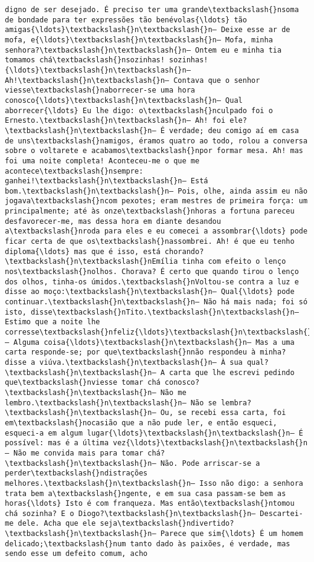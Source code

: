 \documentclass[11pt]{article}
\begin{document}
\begin{Verbatim}[commandchars=\\\{\}]
digno de ser desejado. É preciso ter uma grande\textbackslash{}nsoma de bondade para ter expressões tão benévolas{\ldots} tão amigas{\ldots}\textbackslash{}n\textbackslash{}n— Deixe esse ar de mofa, e{\ldots}\textbackslash{}n\textbackslash{}n— Mofa, minha senhora?\textbackslash{}n\textbackslash{}n— Ontem eu e minha tia tomamos chá\textbackslash{}nsozinhas! sozinhas!{\ldots}\textbackslash{}n\textbackslash{}n— Ah!\textbackslash{}n\textbackslash{}n— Contava que o senhor viesse\textbackslash{}naborrecer-se uma hora conosco{\ldots}\textbackslash{}n\textbackslash{}n— Qual aborrecer{\ldots} Eu lhe digo: o\textbackslash{}nculpado foi o Ernesto.\textbackslash{}n\textbackslash{}n— Ah! foi ele?\textbackslash{}n\textbackslash{}n— É verdade; deu comigo aí em casa de uns\textbackslash{}namigos, éramos quatro ao todo, rolou a conversa sobre o voltarete e acabamos\textbackslash{}npor formar mesa. Ah! mas foi uma noite completa! Aconteceu-me o que me acontece\textbackslash{}nsempre: ganhei!\textbackslash{}n\textbackslash{}n— Está bom.\textbackslash{}n\textbackslash{}n— Pois, olhe, ainda assim eu não jogava\textbackslash{}ncom pexotes; eram mestres de primeira força: um principalmente; até às onze\textbackslash{}nhoras a fortuna pareceu desfavorecer-me, mas dessa hora em diante desandou a\textbackslash{}nroda para eles e eu comecei a assombrar{\ldots} pode ficar certa de que os\textbackslash{}nassombrei. Ah! é que eu tenho diploma{\ldots} mas que é isso, está chorando?\textbackslash{}n\textbackslash{}nEmília tinha com efeito o lenço nos\textbackslash{}nolhos. Chorava? É certo que quando tirou o lenço dos olhos, tinha-os úmidos.\textbackslash{}nVoltou-se contra a luz e disse ao moço:\textbackslash{}n\textbackslash{}n— Qual{\ldots} pode continuar.\textbackslash{}n\textbackslash{}n— Não há mais nada; foi só isto, disse\textbackslash{}nTito.\textbackslash{}n\textbackslash{}n— Estimo que a noite lhe corresse\textbackslash{}nfeliz{\ldots}\textbackslash{}n\textbackslash{}n— Alguma coisa{\ldots}\textbackslash{}n\textbackslash{}n— Mas a uma carta responde-se; por que\textbackslash{}nnão respondeu à minha? disse a viúva.\textbackslash{}n\textbackslash{}n— À sua qual?\textbackslash{}n\textbackslash{}n— A carta que lhe escrevi pedindo que\textbackslash{}nviesse tomar chá conosco?\textbackslash{}n\textbackslash{}n— Não me lembro.\textbackslash{}n\textbackslash{}n— Não se lembra?\textbackslash{}n\textbackslash{}n— Ou, se recebi essa carta, foi em\textbackslash{}nocasião que a não pude ler, e então esqueci, esqueci-a em algum lugar{\ldots}\textbackslash{}n\textbackslash{}n— É possível: mas é a última vez{\ldots}\textbackslash{}n\textbackslash{}n— Não me convida mais para tomar chá?\textbackslash{}n\textbackslash{}n— Não. Pode arriscar-se a perder\textbackslash{}ndistrações melhores.\textbackslash{}n\textbackslash{}n— Isso não digo: a senhora trata bem a\textbackslash{}ngente, e em sua casa passam-se bem as horas{\ldots} Isto é com franqueza. Mas então\textbackslash{}ntomou chá sozinha? E o Diogo?\textbackslash{}n\textbackslash{}n— Descartei-me dele. Acha que ele seja\textbackslash{}ndivertido?\textbackslash{}n\textbackslash{}n— Parece que sim{\ldots} É um homem delicado;\textbackslash{}num tanto dado às paixões, é verdade, mas sendo esse um defeito comum, acho 
\end{Verbatim}
\end{document}
